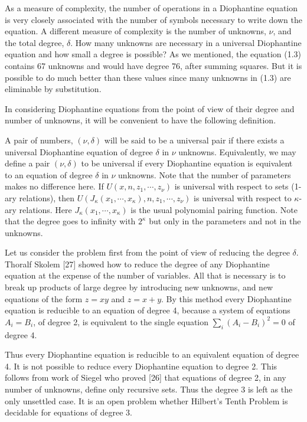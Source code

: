 \documentclass[11pt,a4paper]{article}
\newcommand{\origpage}[1]{\marginnote{\footnotesize\textbf{[#1]}}}
\begin{document}
As a measure of complexity, the number of operations in a Diophantine equation is very closely associated with the number of symbols necessary to write down the equation. A different measure of complexity is the number of unknowns, $\nu$, and the total degree, $\delta$. How many unknowns are necessary in a universal Diophantine equation and how small a degree is possible? As we mentioned, the equation (1.3) contains 67 unknowns and would have degree 76, after summing squares. But it is possible to do much better than these values since many unknowns in (1.3) are eliminable by substitution.

In considering Diophantine equations from the point of view of their degree and number of unknowns, it will be convenient to have the following definition.

\origpage{339}A pair of numbers, $(\nu, \delta)$ will be said to be a universal pair if there exists a universal Diophantine equation of degree $\delta$ in $\nu$ unknowns. Equivalently, we may define a pair $(\nu, \delta)$ to be universal if every Diophantine equation is equivalent to an equation of degree $\delta$ in $\nu$ unknowns. Note that the number of parameters makes no difference here. If $U\left(x, n, z_{1}, \cdots, z_{\nu}\right)$ is universal with respect to sets (1-ary relations), then $U\left(J_{\kappa}\left(x_{1}, \cdots, x_{\kappa}\right), n, z_{1}, \cdots, z_{\nu}\right)$ is universal with respect to $\kappa$-ary relations. Here $J_{\kappa}\left(x_{1}, \cdots, x_{\kappa}\right)$ is the usual polynomial pairing function. Note that the degree goes to infinity with $2^{\kappa}$ but only in the parameters and not in the unknowns.

Let us consider the problem first from the point of view of reducing the degree $\delta$. Thoralf Skolem [27] showed how to reduce the degree of any Diophantine equation at the expense of the number of variables. All that is necessary is to break up products of large degree by introducing new unknowns, and new equations of the form $z=x y$ and $z=x+y$. By this method every Diophantine equation is reducible to an equation of degree 4, because a system of equations $A_{i}=B_{i}$, of degree 2, is equivalent to the single equation $\sum_i(A_i-B_i)^2=0$ of degree 4.

Thus every Diophantine equation is reducible to an equivalent equation of degree 4. It is not possible to reduce every Diophantine equation to degree 2. This follows from work of Siegel who proved [26] that equations of degree 2, in any number of unknowns, define only recursive sets. Thus the degree 3 is left as the only unsettled case. It is an open problem whether Hilbert's Tenth Problem is decidable for equations of degree 3.
\end{document}
